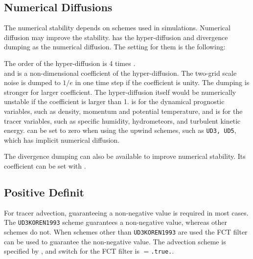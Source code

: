 \subsection{Numerical Diffusions}

The numerical stability depends on schemes used in simulations.
Numerical diffusion may improve the stability.
\scalerm has the hyper-diffusion and divergence dumping as the numerical diffusion.
The setting for them is the following:


The order of the hyper-diffusion is 4 times .\\
 and  is a non-dimensional coefficient of the hyper-diffusion.
The two-grid scale noise is dumped to $1/e$ in one time step if the coefficient is unity.
The dumping is stronger for larger coefficient.
The hyper-diffusion itself would be numerically unstable if the coefficient is larger than 1.
 is for the dynamical prognostic variables, such as density, momentum and potential temperature, and  is for the tracer variables, such as specific humidity, hydrometeors, and turbulent kinetic energy.
 can be set to zero when using the upwind schemes, such as \verb|UD3, UD5|, which has implicit numerical diffusion.


The divergence dumping can also be available to improve numerical stability.
Its coefficient can be set with .


\subsection{Positive Definit}

For tracer advection, guaranteeing a non-negative value is required in most cases.\\
The \verb|UD3KOREN1993| scheme guarantees a non-negative value, whereas other schemes do not.
When schemes other than \verb|UD3KOREN1993| are used the FCT filter can be used to guarantee the non-negative value.
The advection scheme is specified by , and switch for the FCT filter is $=$\verb|.true.|.


